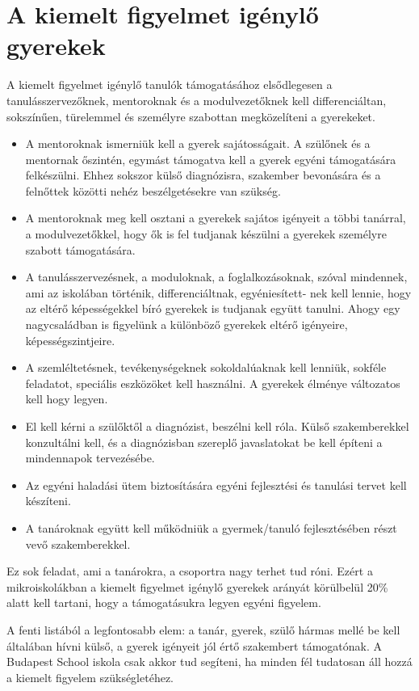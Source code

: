 \section{A kiemelt figyelmet igénylő gyerekek}
\label{sec:kiemelt_figyelem}

A kiemelt figyelmet igénylő tanulók támogatásához  elsődlegesen a tanulásszervezőknek, mentoroknak és a modulvezetőknek kell differenciáltan, sokszínűen, türelemmel és személyre szabottan megközelíteni a gyerekeket.

\begin{itemize}
      \item A mentoroknak ismerniük kell a gyerek sajátosságait. A szülőnek és a mentornak őszintén, egymást támogatva kell a gyerek egyéni támogatására felkészülni. Ehhez sokszor külső diagnózisra, szakember bevonására és a felnőttek közötti nehéz beszélgetésekre van szükség.
      \item A mentoroknak meg kell osztani a gyerekek sajátos igényeit a többi tanárral, a modulvezetőkkel, hogy ők is fel tudjanak készülni a gyerekek személyre szabott támogatására.
      \item A tanulásszervezésnek, a moduloknak, a foglalkozásoknak, szóval min\-dennek, ami az iskolában történik,  differenciáltnak, egyéniesített-\break
      nek kell lennie, hogy az eltérő képességekkel bíró gyerekek is tudjanak együtt tanulni. Ahogy egy nagycsaládban  is figyelünk a különböző gyerekek eltérő igényeire, képességszintjeire.
      \item A szemléltetésnek, tevékenységeknek sokoldalúaknak kell lenniük, sokféle feladatot, speciális eszközöket kell használni. A gyerekek élménye változatos kell hogy legyen.
      \item El kell kérni a szülőktől a diagnózist, beszélni kell róla. Külső szakemberekkel konzultálni kell, és a diagnózisban szereplő javaslatokat be kell építeni a mindennapok tervezésébe.
      \item Az egyéni haladási ütem biztosítására egyéni fejlesztési és tanulási tervet kell készíteni.
      \item A tanároknak együtt kell működniük a gyermek/tanuló fejlesztésében részt vevő szakemberekkel.
\end{itemize}

Ez sok feladat, ami a tanárokra, a csoportra nagy terhet tud róni. Ezért a mikroiskolákban a kiemelt figyelmet igénylő gyerekek arányát körülbelül 20\% alatt kell tartani, hogy a támogatásukra legyen egyéni figyelem.

A fenti listából a legfontosabb elem: a tanár, gyerek, szülő hármas mellé be kell általában hívni külső, a gyerek igényeit jól értő szakembert támogatónak. A Budapest School iskola csak akkor tud segíteni, ha minden fél tudatosan áll hozzá a kiemelt figyelem szükségletéhez.